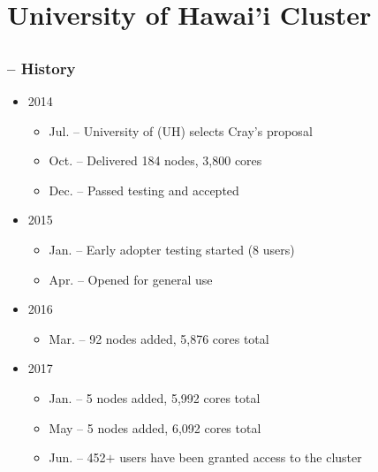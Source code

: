 \section{University of Hawai'i Cluster}

\subsection{{\craycs}}
\begin{frame}
\frametitle{{\craycs} -- History}
\begin{itemize}
\item[] 2014
  \begin{itemize}
  \item Jul. -- University of {\hawaii} (UH) selects Cray's proposal
  \item Oct. -- Delivered 184 nodes, 3,800 cores
  \item Dec. -- Passed testing and accepted
  \end{itemize}

\item[] 2015
  \begin{itemize}
  \item Jan. -- Early adopter testing started (8 users)
  \item Apr. -- Opened for general use
  \end{itemize}
\item[] 2016
  \begin{itemize}
  \item Mar. -- 92 nodes added, 5,876 cores total
  \end{itemize}
\item[] 2017
  \begin{itemize}
  \item Jan. -- 5 nodes added, 5,992 cores total
  \item May -- 5 nodes added, 6,092 cores total
  \item Jun. -- 452$+$ users have been granted access to the cluster
  \end{itemize}
\end{itemize}
\end{frame}


